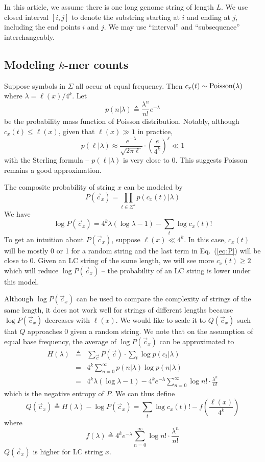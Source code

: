 \documentclass[webpdf,contemporary,large,namedate]{oup-authoring-template}%
\begin{document}
In this article, we assume there is one long genome string of length $L$.
We use closed interval $[i,j]$ to denote the substring starting at $i$
and ending at $j$, including the end points $i$ and $j$.
We may use ``interval'' and ``subsequence'' interchangeably.

\subsection{Modeling $k$-mer counts}

Suppose symbols in $\Sigma$ all occur at equal frequency.
Then $c_x(t)\sim{\rm Poisson}(\lambda)$ where $\lambda=\ell(x)/4^k$.
Let
$$
p(n|\lambda)\triangleq\frac{\lambda^n}{n!}e^{-\lambda}
$$
be the probability mass function of Poisson distribution.
Notably, although $c_x(t)\le\ell(x)$, given that $\ell(x)\gg1$ in practice,
$$
p(\ell|\lambda)\approx\frac{e^{-\lambda}}{\sqrt{2\pi\ell}}\cdot\left(\frac{e}{4^k}\right)^{\ell}\ll 1
$$
with the Sterling formula -- $p(\ell|\lambda)$ is very close to 0.
This suggests Poisson remains a good approximation.

The composite probability of string $x$ can be modeled by
$$
P(\vec{c}_x)=\prod_{t\in\Sigma^k}p(c_x(t)|\lambda)
$$
We have
\begin{equation}\label{eq:P}
\log P(\vec{c}_x)=4^k\lambda(\log\lambda-1)-\sum_t\log c_x(t)!
\end{equation}
To get an intuition about $P(\vec{c}_x)$, suppose $\ell(x)\ll4^k$.
In this case, $c_x(t)$ will be mostly 0 or 1 for a random string
and the last term in Eq.~(\ref{eq:P}) will be close to 0.
Given an LC string of the same length,
we will see more $c_x(t)\ge2$ which will reduce $\log P(\vec{c}_x)$
-- the probability of an LC string is lower under this model.

Although $\log P(\vec{c}_x)$ can be used to compare the complexity of strings of the same length,
it does not work well for strings of different lengths because $\log P(\vec{c}_x)$ decreases with $\ell(x)$.
We would like to scale it to $Q(\vec{c}_x)$ such that
$Q$ approaches 0 given a random string.
We note that on the assumption of equal base frequency,
the average of $\log P(\vec{c}_x)$ can be approximated to
\begin{eqnarray*}
H(\lambda)&\triangleq&\sum_{\vec{c}}P(\vec{c})\cdot\sum_t\log p(c_t|\lambda)\\
&=&4^k\sum_{n=0}^{\infty}p(n|\lambda)\log p(n|\lambda)\\
&=&4^k\lambda(\log\lambda-1)-4^ke^{-\lambda}\sum_{n=0}^{\infty}\log n!\cdot\frac{\lambda^n}{n!}
\end{eqnarray*}
which is the negative entropy of $P$.
We can thus define
$$
Q(\vec{c}_x)\triangleq H(\lambda)-\log P(\vec{c}_x)=\sum_t\log c_x(t)!-f\left(\frac{\ell(x)}{4^k}\right)
$$
where
$$
f(\lambda)\triangleq4^ke^{-\lambda}\sum_{n=0}^\infty\log n!\cdot\frac{\lambda^n}{n!}
$$
$Q(\vec{c}_x)$ is higher for LC string $x$.
\end{document}

